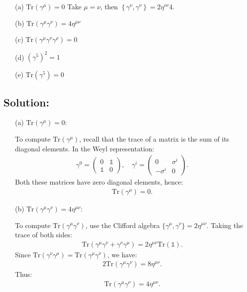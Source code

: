 \begin{itemize}
    \item[(a)] $\text{Tr}(\gamma^\mu) = 0$
    Take $\mu=\nu$, then $\left\{\gamma^\nu,\gamma^\nu\right\}=2\eta^{\nu\nu}$4.
    \item[(b)] $\text{Tr}(\gamma^\mu\gamma^\nu) = 4\eta^{\mu\nu}$
    \item[(c)] $\text{Tr}(\gamma^\mu\gamma^\nu\gamma^\rho) = 0$
    \item[(d)] $(\gamma^5)^2 = 1$
    \item[(e)] $\text{Tr}(\gamma^5) = 0$
\end{itemize}
\subsection*{Solution:}
\begin{enumerate}
    \item [(a)] $\text{Tr}(\gamma^\mu) = 0$:

To compute $\text{Tr}(\gamma^\mu)$, recall that the trace of a matrix is the sum of its diagonal elements. In the Weyl representation:
\begin{align*}
    \gamma^0 =
    \begin{pmatrix}
    0 & \mathds{1} \\
    \mathds{1} & 0
    \end{pmatrix}
    ,\quad \gamma^i =
    \begin{pmatrix}
    0 & \sigma^i \\
    -\sigma^i & 0
    \end{pmatrix}.
\end{align*}
Both these matrices have zero diagonal elements, hence:
\begin{align*}
    \text{Tr}(\gamma^\mu) = 0.
\end{align*}

\item [(b)] $\text{Tr}(\gamma^\mu \gamma^\nu) = 4\eta^{\mu\nu}$:

To compute $\text{Tr}(\gamma^\mu \gamma^\nu)$, use the Clifford algebra $\{\gamma^\mu, \gamma^\nu\} = 2\eta^{\mu\nu}$. Taking the trace of both sides:
\begin{align*}
    \text{Tr}(\gamma^\mu \gamma^\nu + \gamma^\nu \gamma^\mu) = 2\eta^{\mu\nu} \text{Tr}(\mathds{1}).
\end{align*}
Since $\text{Tr}(\gamma^\nu \gamma^\mu) = \text{Tr}(\gamma^\mu \gamma^\nu)$, we have:
\begin{align*}
    2\text{Tr}(\gamma^\mu \gamma^\nu) = 8 \eta^{\mu\nu}.
\end{align*}
Thus:
\begin{align*}
    \text{Tr}(\gamma^\mu \gamma^\nu) = 4\eta^{\mu\nu}.
\end{align*}


\end{enumerate}
